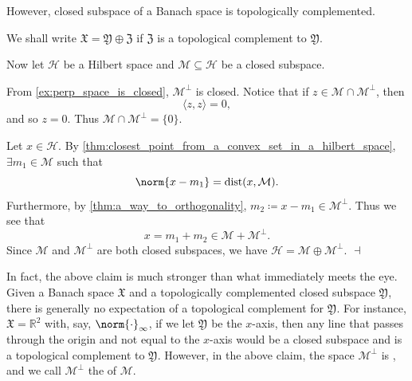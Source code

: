 \documentclass[notoc,notitlepage]{tufte-book}
\newtheorem*{culture}{\faWineGlass Culture}
\DeclareMathOperator{\dist}{dist}
\begin{document}
\begin{remark}
\begin{enumerate}
      However,  closed subspace of a Banach space
      is topologically complemented.
      
      We shall write $\mathfrak{X} = \mathfrak{Y} \oplus \mathfrak{Z}$
      if $\mathfrak{Z}$ is a topological complement to $\mathfrak{Y}$.

      Now let $\mathcal{H}$ be a Hilbert space
      and $\mathcal{M} \subseteq \mathcal{H}$ be a closed subspace.

      \noindent
      From \cref{ex:perp_space_is_closed}, $\mathcal{M}^{\perp}$ is closed.
      Notice that if $z \in \mathcal{M} \cap \mathcal{M}^{\perp}$,
      then
      \begin{equation*}
        \langle z, z \rangle = 0,
      \end{equation*}
      and so $z = 0$. Thus $\mathcal{M} \cap \mathcal{M}^{\perp} = \{ 0 \}$.

      Let $x \in \mathcal{H}$. By
      \cref{thm:closest_point_from_a_convex_set_in_a_hilbert_space},
      $\exists m_1 \in \mathcal{M}$ such that
      \begin{equation*}
        \norm{x - m_1} = \dist(x, \mathcal{M}).
      \end{equation*}
      Furthermore, by \cref{thm:a_way_to_orthogonality},
      $m_2 \coloneqq x - m_1 \in \mathcal{M}^{\perp}$. Thus we see that
      \begin{equation*}
        x = m_1 + m_2 \in \mathcal{M} + \mathcal{M}^{\perp}.
      \end{equation*}
      Since $\mathcal{M}$ and $\mathcal{M}^{\perp}$ are both closed subspaces,
      we have $\mathcal{H} = \mathcal{M} \oplus \mathcal{M}^{\perp}$. $\dashv$

      In fact, the above claim is much stronger than
      what immediately meets the eye.
      Given a Banach space $\mathfrak{X}$ and a
      topologically complemented closed subspace $\mathfrak{Y}$,
      there is generally no expectation of
      a  topological complement for $\mathfrak{Y}$.
      For instance, $\mathfrak{X} = \mathbb{R}^2$ with, say,
      $\norm{\cdot}_\infty$,
      if we let $\mathfrak{Y}$ be the $x$-axis,
      then any line that passes through the origin
      and not equal to the $x$-axis would be a closed subspace
      and is a topological complement to $\mathfrak{Y}$.
      However, in the above claim,
      the space $\mathcal{M}^{\perp}$ is ,
      and we call $\mathcal{M}^{\perp}$ the 
      of $\mathcal{M}$.


\end{enumerate}
\end{remark}
\end{document}
